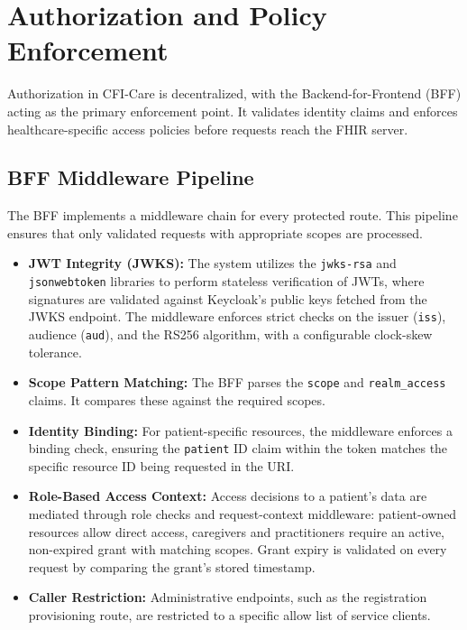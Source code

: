 \section{Authorization and Policy Enforcement}\label{sec:security-authZ}

Authorization in CFI-Care is decentralized, with the Backend-for-Frontend (BFF) acting as the primary enforcement point. 
It validates identity claims and enforces healthcare-specific access policies before requests reach the \ac{FHIR} server.

\subsection{BFF Middleware Pipeline}

The BFF implements a middleware chain for every protected route. 
This pipeline ensures that only validated requests with appropriate scopes are processed.

\begin{itemize}
    \item \textbf{JWT Integrity (JWKS):} The system utilizes the \texttt{jwks-rsa} and \texttt{jsonwebtoken} libraries to perform stateless verification of \acp{JWT}, where 
    signatures are validated against Keycloak's public keys fetched from the JWKS endpoint. 
    The middleware enforces strict checks on the issuer (\texttt{iss}), audience (\texttt{aud}), and the RS256 algorithm, with a configurable clock-skew tolerance.
    \item \textbf{Scope Pattern Matching:} The BFF parses the \texttt{scope} and \texttt{realm\_access} claims. It compares these against the required scopes. 
    \item \textbf{Identity Binding:} For patient-specific resources, the middleware enforces a binding check, ensuring the \texttt{patient} ID claim within the token matches the specific resource ID being requested in the URI.
    \item \textbf{Role-Based Access Context:} Access decisions to a patient's data are mediated through role checks and request-context middleware: patient-owned resources allow direct access, caregivers and practitioners require an active, non-expired grant with matching scopes. 
    Grant expiry is validated on every request by comparing the grant's stored timestamp.
    \item \textbf{Caller Restriction:} Administrative endpoints, such as the registration provisioning route, are restricted to a specific allow list of service clients.
\end{itemize}


